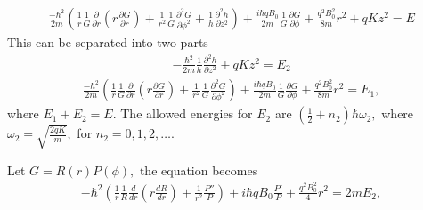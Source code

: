 \begin{enumerate}
\begin{align*}
               \frac{-\hbar^2}{2m}
               (\frac{1}{r}\frac{1}{G}\frac{\partial}{\partial r}(r\frac{\partial G}{\partial r})  + 
               \frac{1}{r^2}
               \frac{1}{G}
               \frac{\partial^2G}{\partial\phi^2}
                + 
                \frac{1}{h}\frac{\partial^2 h}{\partial z^2}
               )
               +\frac{i\hbar qB_0}{2m}\frac{1}{G}\frac{\partial G}{\partial\phi}
               +\frac{q^2B_0^2}{8m}r^2
               +qKz^2= E
           \end{align*}
           This can be separated into two parts
           \begin{align*}
               -\frac{\hbar^2}{2m}
               \frac{1}{h}\frac{\partial^2h}{\partial z^2}
               +qKz^2=E_2
           \end{align*}
           \begin{align*}
               \frac{-\hbar^2}{2m}
               (\frac{1}{r}\frac{1}{G}\frac{\partial}{\partial r}(r\frac{\partial G}{\partial r}) + 
               \frac{1}{r^2}
               \frac{1}{G}
               \frac{\partial^2G}{\partial\phi^2}
               )
               +\frac{i\hbar qB_0}{2m}\frac{1}{G}\frac{\partial G}{\partial\phi}
               +\frac{q^2B_0^2}{8m}r^2= E_1,
           \end{align*}
           where $E_1+E_2=E.$
           The allowed energies for $E_2$ are 
           $\left(\frac{1}{2}+n_2\right)\hbar\omega_2,$ where $\omega_2=\sqrt{\frac{2qK}{m}},$ for $n_2=0,1,2,\dots.$

           Let $G=R(r)P(\phi),$
           the equation becomes
           \begin{align*}
              -\hbar^2
               (\frac{1}{r}\frac{1}{R}\frac{d}{d r}(r\frac{d R}{d r}) +
               \frac{1}{r^2}
               \frac{P''}{P}
               )
               +i\hbar qB_0\frac{P'}{P}
               +\frac{q^2B_0^2}{4}r^2= 2mE_2,
           \end{align*}


\end{enumerate}
